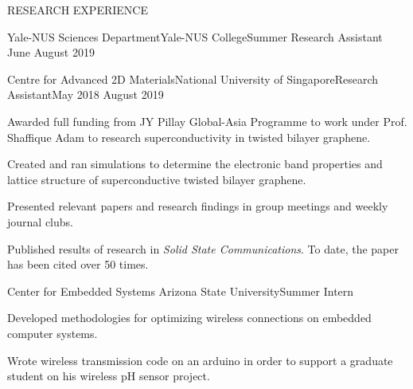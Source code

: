 \documentclass{resume} %
\begin{document}
\begin{rSection}{RESEARCH EXPERIENCE}
\begin{rSubsection}{Yale-NUS Sciences Department}{Yale-NUS College}{Summer Research Assistant}{  June  {\textendash} August 2019}
\end{rSubsection}

\begin{rSubsection}{Centre for Advanced 2D Materials}{National University of Singapore}{Research Assistant}{May 2018 {\textendash} August 2019}
\item Awarded full funding from JY Pillay Global-Asia Programme to work under Prof. Shaffique Adam to research superconductivity in twisted bilayer graphene.
\item Created and ran simulations to determine the electronic band properties and lattice structure of superconductive twisted bilayer graphene.
\item Presented relevant papers and research findings in group meetings and weekly journal clubs.
\item Published results of research in \textit{Solid State Communications}. To date, the paper has been cited over 50 times. 
\end{rSubsection}

\newpage

\begin{rSubsection}{Center for Embedded Systems }{Arizona State University}{Summer Intern}{}
\item Developed methodologies for optimizing wireless connections on embedded computer systems.
\item Wrote wireless transmission code on an arduino in order to support a graduate student on his wireless pH sensor project.
\end{rSubsection}









\end{rSection}
\end{document}
